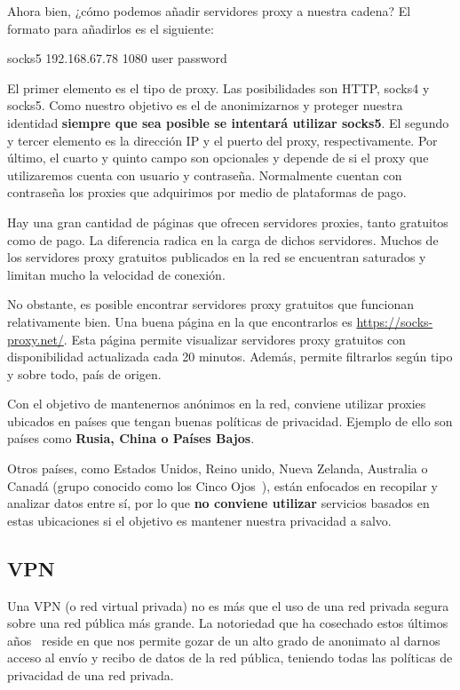 Ahora bien, ¿cómo podemos añadir servidores proxy a nuestra cadena?
El formato para añadirlos es el siguiente:


{\selectfont 
	socks5  192.168.67.78   1080    user   password
}

El primer elemento es el tipo de proxy. Las posibilidades son HTTP, socks4 y socks5. Como nuestro objetivo es el de anonimizarnos y proteger nuestra identidad \textbf{siempre que sea posible se intentará utilizar socks5}.
El segundo y tercer elemento es la dirección IP y el puerto del proxy, respectivamente. 
Por último, el cuarto y quinto campo son opcionales y depende de si el proxy que utilizaremos cuenta con usuario y contraseña. Normalmente cuentan con contraseña los proxies que adquirimos por medio de plataformas de pago.

Hay una gran cantidad de páginas que ofrecen servidores proxies, tanto gratuitos como de pago. La diferencia radica en la carga de dichos servidores. Muchos de los servidores proxy gratuitos publicados en la red se encuentran saturados y limitan mucho la velocidad de conexión.

No obstante, es posible encontrar servidores proxy gratuitos que funcionan relativamente bien. Una buena página en la que encontrarlos es \url{https://socks-proxy.net/}. 
Esta página permite visualizar servidores proxy gratuitos con disponibilidad actualizada cada 20 minutos. Además, permite filtrarlos según tipo y sobre todo, país de origen.

Con el objetivo de mantenernos anónimos en la red, conviene utilizar proxies ubicados en países que tengan buenas políticas de privacidad. Ejemplo de ello son países como \textbf{Rusia, China o Países Bajos}. 

Otros países, como Estados Unidos, Reino unido, Nueva Zelanda, Australia o Canadá (grupo conocido como los Cinco Ojos~\cite{article:politicas}), están enfocados en recopilar y analizar datos entre sí, por lo que \textbf{no conviene utilizar} servicios basados en estas ubicaciones si el objetivo es mantener nuestra privacidad a salvo.  

\subsection{VPN}

Una VPN (o red virtual privada) no es más que el uso de una red privada segura sobre una red pública más grande. 
La notoriedad que ha cosechado estos últimos años~\cite{article:notoriedad} reside en que nos permite gozar de un alto grado de anonimato al darnos acceso al envío y recibo de datos de la red pública, teniendo todas las políticas de privacidad de una red privada.

